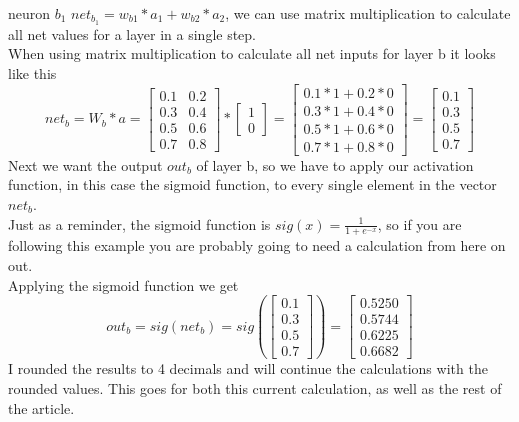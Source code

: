 \documentclass[11pt, halfparskip]{article}
\begin{document}
        neuron $b_1$ $net_{b_1} = w_{b1} * a_1 + w_{b2} * a_2$, we can use matrix multiplication to calculate all net values for a layer in a single step.\\
        When using matrix multiplication to calculate all net inputs for layer b it looks like this
        \[
           net_b = W_b * a =
        	\begin{bmatrix}
        	 	0.1 & 0.2\\
            	0.3 & 0.4\\
            	0.5 & 0.6\\
            	0.7 & 0.8
        	\end{bmatrix}
        	*
        	\begin{bmatrix}
        		1\\
        		0
        	\end{bmatrix}
        	=
        	\begin{bmatrix}
        		0.1 * 1 + 0.2 * 0\\
        		0.3 * 1 + 0.4 * 0\\
        		0.5 * 1 + 0.6 * 0\\
        		0.7 * 1 + 0.8 * 0
        	\end{bmatrix}
        	=
        	\begin{bmatrix}
        		0.1\\
        		0.3\\
        		0.5\\
        		0.7
        	\end{bmatrix}
        \]
        Next we want the output $out_b$ of layer b, so we have to apply our activation function, in this case the sigmoid function, to every single element in the vector $net_b$.\\
        Just as a reminder, the sigmoid function is $sig(x) = \frac{1}{1+ e^{-x}}$, so if you are following this example you are probably going to need a calculation from here on out.\\
        Applying the sigmoid function we get
        \[
        	out_b = sig(net_b) = sig(
        	   \begin{bmatrix}
	        	0.1\\
        		0.3\\
        		0.5\\
        		0.7
        	   \end{bmatrix}
        	) = 
        	\begin{bmatrix}
        		0.5250\\
        		0.5744\\
        		0.6225\\
        		0.6682
        	\end{bmatrix}
        \]
        I rounded the results to 4 decimals and will continue the calculations with the rounded values. This goes for both this current calculation, as well as the rest of the article.
        
\end{document}
